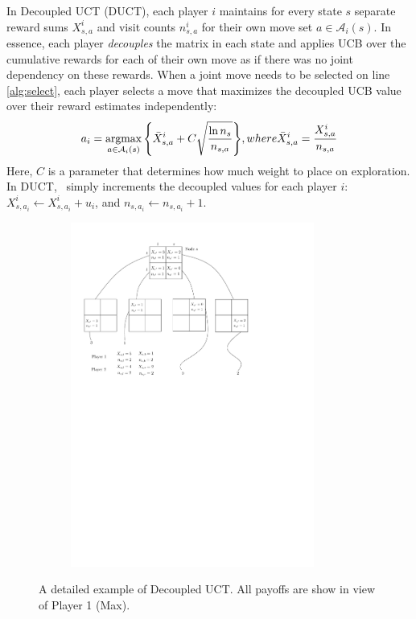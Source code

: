 \documentclass[conference]{IEEEtran}
\newcommand{\argmax}{\operatornamewithlimits{argmax}}
\newcommand{\cA}{\mathcal{A}}
\begin{document}
In Decoupled UCT (DUCT), each player $i$ maintains for every state $s$ separate reward sums $X^i_{s,a}$ and 
visit counts $n^i_{s,a}$ for their own move set $a \in \cA_i(s)$. 
In essence, each player {\it decouples} the matrix in each state and applies UCB over the cumulative rewards for 
each of their own move as if there was no joint dependency on these rewards.
When a joint move needs to be selected on line 
\ref{alg:select}, each player selects a move that maximizes the decoupled UCB value over their reward estimates 
independently:
\begin{equation}
\label{eq:duct}
a_i = \argmax_{a \in \cA_i(s)}{ \left\{ \bar{X}^i_{s,a} + C \sqrt{\frac{\ln n_s}{n_{s,a}}} \right\} }, 
  \mbox{ where } \bar{X}^i_{s,a} = \frac{X^i_{s,a}}{n_{s,a}}
\end{equation}
\noindent Here, $C$ is a parameter that determines how much weight to place on exploration. 
In DUCT, \Update~simply increments the decoupled values for each player $i$: $X^i_{s,a_i} \leftarrow X^i_{s,a_i} + u_i$,
and $n_{s,a_i} \leftarrow n_{s,a_i} + 1$. 

\begin{figure}[t!]
\centering
\begin{subfigure}{8cm}
\centering
\includegraphics[width=8.0cm]{figures/tree3}\\
\end{subfigure}
\caption{A detailed example of Decoupled UCT. All payoffs are show in view of Player 1 (Max).\label{fig:example2}}
\end{figure}
\end{document}
